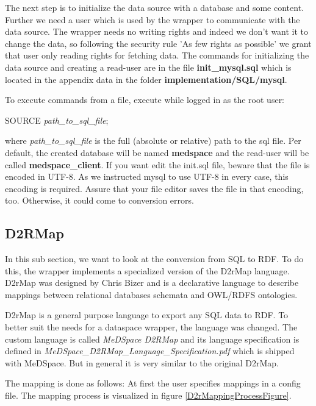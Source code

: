 The next step is to initialize the data source with a database and some content. Further we need a user which is used by the wrapper to communicate with the data source. The wrapper needs no writing rights and indeed we don't want it to change the data, so following the security rule 'As few rights as possible' we grant that user only reading rights for fetching data. The commands for initializing the data source and creating a read-user are in the file \textbf{init\_mysql.sql} which is located in the appendix data in the folder \textbf{implementation/SQL/mysql}.

To execute commands from a file, execute while logged in as the root user:

\begin{codebox}
	SOURCE \emph{path\_to\_sql\_file};
\end{codebox}

where \emph{path\_to\_sql\_file} is the full (absolute or relative) path to the sql file.
Per default, the created database will be named \textbf{medspace} and the read-user will be called \textbf{medspace\_client}. If you want edit the init.sql file, beware that the file is encoded in UTF-8. As we instructed mysql to use UTF-8 in every case, this encoding is required. Assure that your file editor saves the file in that encoding, too. Otherwise, it could come to conversion errors.


\subsection{D2RMap}

In this sub section, we want to look at the conversion from SQL to RDF. To do this, the wrapper implements a specialized version of the D2rMap language. D2rMap was designed by Chris Bizer and is  a declarative language to describe mappings between relational databases schemata and OWL/RDFS ontologies\cite{D2rMap_aDatabaseToRdfMappingLanguage}.

D2rMap is a general purpose language to export any SQL data to RDF. To better suit the needs for a dataspace wrapper, the language was changed. The custom language is called \emph{MeDSpace D2RMap} and its language specification is defined in \emph{MeDSpace\_D2RMap\_Language\_Specification.pdf} which is shipped with MeDSpace. But in general it is very similar to the original D2rMap.

The mapping is done as follows: At first the user specifies mappings in a config file. 
The mapping process is visualized in figure \ref{D2rMappingProcessFigure}.

